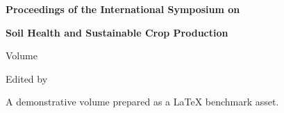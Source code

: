 \begin{titlepage}
  \centering
  \vspace*{30mm}
  {\LARGE\bfseries Proceedings of the International Symposium on\par}
  \vspace{4mm}
  {\LARGE\bfseries Soil Health and Sustainable Crop Production\par}
  \vspace{14mm}
  {\Large Volume \volumenumber\par}
  \vspace{30mm}
  {\large Edited by\par}
  \vspace{3mm}
  {\Large \volumeeditor\par}
  \vfill
  {\small A demonstrative volume prepared as a LaTeX benchmark asset.\par}
\end{titlepage}
